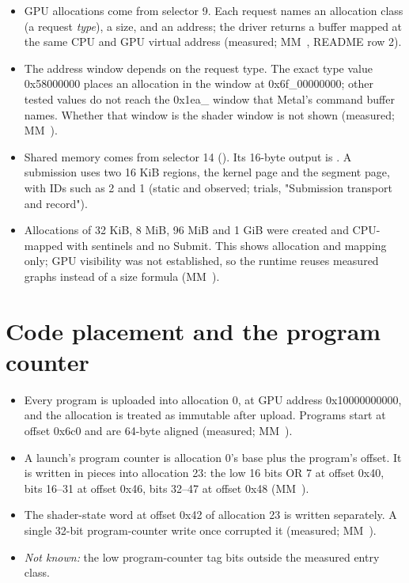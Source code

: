 \begin{itemize}
\item GPU allocations come from selector 9. Each request names an allocation class (a request \emph{type}), a size, and an
  address; the driver returns a buffer mapped at the same CPU and GPU virtual address (measured; MM~, README row 2).
\item The address window depends on the request type. The exact type value 0x58000000 places an allocation in the window
  at 0x6f\_00000000; other tested values do not reach the 0x1ea\_ window that Metal's command buffer names. Whether that
  window is the shader window is not shown (measured; MM~).
\item Shared memory comes from selector 14 (). Its 16-byte output is
  . A submission uses two 16 KiB regions, the kernel page and the segment
  page, with IDs such as 2 and 1 (static and observed; trials, "Submission transport and record").
\item Allocations of 32 KiB, 8 MiB, 96 MiB and 1 GiB were created and CPU-mapped with sentinels and no Submit.
  This shows allocation and mapping only; GPU visibility was not established, so the runtime reuses measured graphs
  instead of a size formula (MM~).
\end{itemize}

\section{Code placement and the program counter}\label{sec:code-placement-program}

\begin{itemize}
\item Every program is uploaded into allocation 0, at GPU address 0x10000000000, and the allocation is treated as immutable
  after upload. Programs start at offset 0x6c0 and are 64-byte aligned (measured; MM~).
\item A launch's program counter is allocation 0's base plus the program's offset. It is written in pieces into allocation 23:
  the low 16 bits OR 7 at offset 0x40, bits 16–31 at offset 0x46, bits 32–47 at offset 0x48 (MM~).
\item The shader-state word at offset 0x42 of allocation 23 is written separately. A single 32-bit program-counter write once
  corrupted it (measured; MM~).
\item \emph{Not known:} the low program-counter tag bits outside the measured entry class.
\end{itemize}

